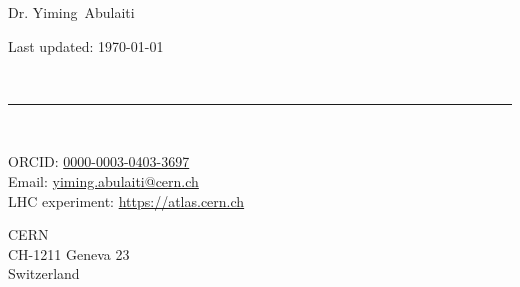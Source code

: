 \documentclass[10pt, a4paper]{article}
\makeatletter
\newcommand{\FirstName}{Yiming}
\newcommand{\LastName}{Abulaiti}
\newcommand{\MyName}{Dr. \FirstName\ \LastName}
\newcommand{\Email}{yiming.abulaiti@cern.ch}
\newcommand{\PersonalWebsite}{www.leouieda.com}
\newcommand{\LabWebsite}{https://atlas.cern.ch}
\newcommand{\ORCID}{0000-0003-0403-3697}
\newcommand{\Address}{
  CERN \\ CH-1211 Geneva 23 \\ Switzerland
}
\newcommand{\Website}[1]{\href{https://#1}{#1}}
\makeatother
\begin{document}
\thispagestyle{empty}

\begin{minipage}[t]{0.7\textwidth}
{\fontsize{22pt}{0}\selectfont\MyName}
\end{minipage}
\begin{minipage}[t]{0.3\textwidth}
  \begin{flushright}
    Last updated: \monthyear\today
  \end{flushright}
\end{minipage}
\\[-0.1cm]
\rule{\textwidth}{2pt}
\\[0.1cm]
\begin{minipage}[t]{0.7\textwidth}
    ORCID: \href{https://orcid.org/\ORCID}{\ORCID}
    \\
    Email: \href{mailto:\Email}{\Email}
    \\
    LHC experiment: \Website{\LabWebsite}
    \\
\end{minipage}
\begin{minipage}[t]{0.3\textwidth}
  \begin{flushright}
    \Address
  \end{flushright}
\end{minipage}



\end{document}
